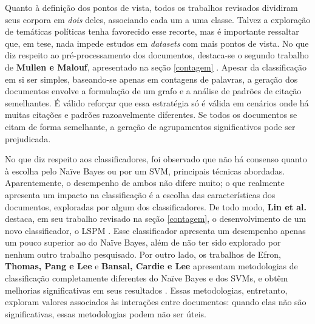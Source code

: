 Quanto à definição dos pontos de vista, todos os trabalhos revisados dividiram seus corpora em \emph{dois} deles, associando cada um a uma classe.  Talvez a exploração de temáticas políticas tenha favorecido esse recorte, mas é importante ressaltar que, em tese, nada impede estudos em \emph{datasets} com mais pontos de vista. No que diz respeito ao pré-processamento dos documentos, destaca-se o segundo trabalho de \textbf{Mullen e Malouf}, apresentado na seção \ref{contagem} \cite{malouf-taking_sides}. Apesar da classificação em si ser simples, baseando-se apenas em contagens de palavras, a geração dos documentos envolve a formulação de um grafo e a análise de padrões de citação semelhantes. É válido reforçar que essa estratégia só é válida em cenários onde há muitas citações e padrões razoavelmente diferentes. Se todos os documentos se citam de forma semelhante, a geração de agrupamentos significativos pode ser prejudicada. 

No que diz respeito aos classificadores, foi observado que não há consenso quanto à escolha pelo Naïve Bayes ou por um SVM, principais técnicas abordadas. Aparentemente, o desempenho de ambos não difere muito; o que realmente apresenta um impacto na classificação é a escolha das características dos documentos, exploradas por algum dos classificadores. De todo modo, \textbf{Lin et al.} destaca, em seu trabalho revisado na seção \ref{contagem}, o desenvolvimento de um novo classificador, o LSPM \cite{lin-et-al2006}. Esse classificador apresenta um desempenho apenas um pouco superior ao do Naïve Bayes, além de não ter sido explorado por nenhum outro trabalho pesquisado. Por outro lado, os trabalhos de Efron, \textbf{Thomas, Pang e Lee} e \textbf{Bansal, Cardie e Lee} apresentam metodologias de classificação completamente diferentes do Naïve Bayes e dos SVMs, e obtêm melhorias significativas em seus resultados \cite{efron} \cite{get-out-the-vote} \cite{disagree}. Essas metodologias, entretanto, exploram valores associados às interações entre documentos: quando elas não são significativas, essas metodologias podem não ser úteis.  

